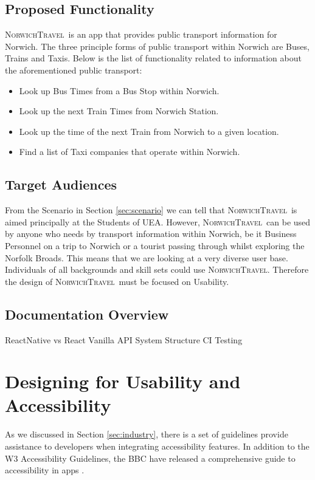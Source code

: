 \documentclass[cmpstyle]{ueacmpstyle}
\newcommand{\nt}{\textsc{NorwichTravel}}
\begin{document}
		\subsection{Proposed Functionality} \label{sec:prop-func}
		\nt \ is an app that provides public transport information for Norwich. The three principle forms of public transport within Norwich are Buses, Trains and Taxis. Below is the list of functionality related to information about the aforementioned public transport:
			\begin{itemize}
				\item Look up Bus Times from a Bus Stop within Norwich.
				\item Look up the next Train Times from Norwich Station.
				\item Look up the time of the next Train from Norwich to a given location.
				\item Find a list of Taxi companies that operate within Norwich. 
			\end{itemize} 
		
		\subsection{Target Audiences} \label{sec:target}
		From the Scenario in Section \ref{sec:scenario} we can tell that \nt \ is aimed principally at the Students of UEA. However, \nt \ can be used by anyone who needs by transport information within Norwich, be it Business Personnel on a trip to Norwich or a tourist passing through whilst exploring the Norfolk Broads. This means that we are looking at a very diverse user base. Individuals of all backgrounds and skill sets could use \nt. Therefore the design of \nt \ must be focused on Usability. 
		
		\subsection{Documentation Overview} \label{sec:doc-over}
		ReactNative vs React Vanilla
		API System Structure
		CI Testing
		
	\section{Designing for Usability and Accessibility} \label{sec:design}
	As we discussed in Section \ref{sec:industry}, there is a set of guidelines provide assistance to developers when integrating accessibility features. In addition to the W3 Accessibility Guidelines, the BBC have released a comprehensive guide to accessibility in apps \citep{bbcguide}.
	
\end{document}
